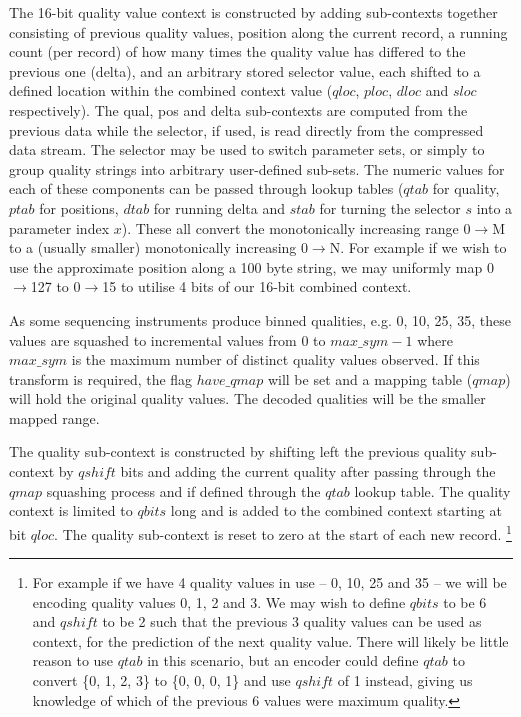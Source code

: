 \documentclass[a4paper]{article}
\begin{document}
The 16-bit quality value context is constructed by adding sub-contexts
together consisting of previous quality values, position along the
current record, a running count (per record) of how many times the
quality value has differed to the previous one (delta), and an
arbitrary stored selector value, each shifted to a defined location
within the combined context value ($qloc$, $ploc$, $dloc$ and
$sloc$ respectively).  The qual, pos and delta sub-contexts are
computed from the previous data while the selector, if used, is read
directly from the compressed data stream.  The selector may be used to
switch parameter sets, or simply to group quality strings into
arbitrary user-defined sub-sets.  The numeric values for each of these
components can be passed through lookup tables ($qtab$ for quality,
$ptab$ for positions, $dtab$ for running delta and $stab$ for turning
the selector $s$ into a parameter index $x$).  These all convert the
monotonically increasing range 0$\rightarrow$M to a (usually smaller)
monotonically increasing 0$\rightarrow$N.  For example if we wish to
use the approximate position along a 100 byte string, we may uniformly
map 0$\rightarrow$127 to 0$\rightarrow$15 to utilise 4 bits of our
16-bit combined context.

As some sequencing instruments produce binned qualities, e.g. 0, 10, 25,
35, these values are squashed to incremental values from 0 to
$max\_sym-1$ where $max\_sym$ is the maximum number of distinct
quality values observed.  If this transform is required, the flag
$have\_qmap$ will be set and a mapping table ($qmap$) will hold the
original quality values.  The decoded qualities will be the smaller
mapped range.

The quality sub-context is constructed by shifting left the previous
quality sub-context by $qshift$ bits and adding the current quality
after passing through the $qmap$ squashing process and if defined
through the $qtab$ lookup table.  The quality context is limited to
$qbits$ long and is added to the combined context starting at bit
$qloc$.  The quality sub-context is reset to zero at the start of each
new record.
\footnote{For example if we have 4 quality values in use -- 0, 10, 25 and
35 -- we will be encoding quality values 0, 1, 2 and 3.  We may wish to
define $qbits$ to be 6 and $qshift$ to be 2 such that the previous 3
quality values can be used as context, for the prediction of the next
quality value.  There will likely be little reason to use $qtab$ in
this scenario, but an encoder could define $qtab$ to convert \{0, 1, 2, 3\}
to \{0, 0, 0, 1\} and use $qshift$ of 1 instead, giving us
knowledge of which of the previous 6 values were maximum quality.}
\end{document}
